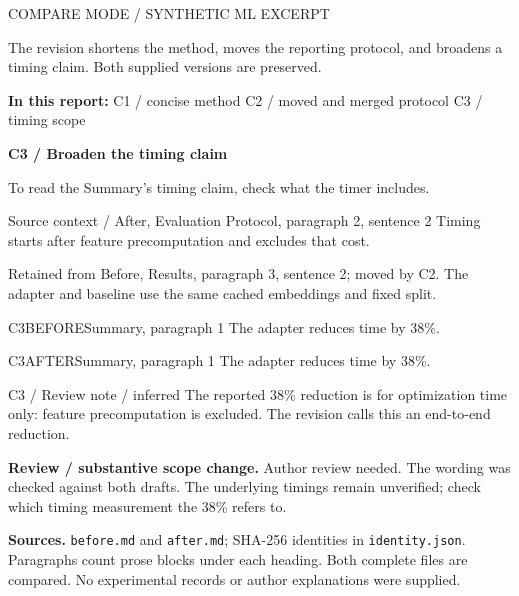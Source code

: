 \documentclass[11pt]{article}
\begin{document}
{\small\color{rcMuted}COMPARE MODE / SYNTHETIC ML EXCERPT}

The revision shortens the method, moves the reporting protocol, and broadens
a timing claim. Both supplied versions are preserved.

{\small\textbf{In this report:} C1 / concise method \quad
C2 / moved and merged protocol \quad C3 / timing scope}

\vspace{8pt}
{\large\bfseries\color{rcInk}C3 / Broaden the timing claim}\par
{\small\color{rcMuted}To read the Summary's timing claim, check what the timer includes.}

\begin{rcContext}{Source context / After, Evaluation Protocol, paragraph 2, sentence 2}
Timing starts after feature precomputation and excludes that cost.
\end{rcContext}
{\small\color{rcMuted}Retained from Before, Results, paragraph 3, sentence 2;
moved by C2. The adapter and baseline use the same cached embeddings and fixed split.}

\begin{rcPassage}{C3}{BEFORE}{Summary, paragraph 1}
The adapter reduces  time by 38\%.
\end{rcPassage}
\begin{rcPassage}{C3}{AFTER}{Summary, paragraph 1}
The adapter reduces  time by 38\%.
\end{rcPassage}
\begin{rcContext}{C3 / Review note / inferred}
The reported 38\% reduction is for optimization time only: feature
precomputation is excluded. The revision calls this an end-to-end reduction.
\end{rcContext}
\textbf{Review / substantive scope change.} Author review needed.
The wording was checked against both drafts. The underlying timings
remain unverified; check which timing measurement the 38\% refers to.

\vfill
{\footnotesize\color{rcMuted}\textbf{Sources.} \texttt{before.md} and
\texttt{after.md}; SHA-256 identities in \texttt{identity.json}.
Paragraphs count prose blocks under each heading. Both complete files are
compared. No experimental records or author explanations were supplied.}

\newpage
{}
\end{document}
